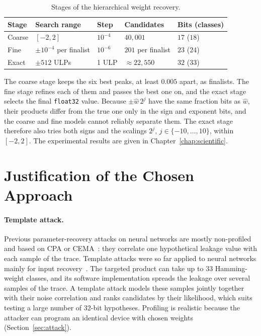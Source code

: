 \begin{table}[htb]
	\centering
	\small
	\caption{Stages of the hierarchical weight recovery.}
	\label{tab:hierarchical-recovery}
	\begin{tabular}{@{}lllll@{}}
		\toprule
		Stage  & Search range               & Step      & Candidates         & Bits (classes) \\
		\midrule
		Coarse & $[-2,2]$                   & $10^{-4}$ & $40{,}001$         & $17$ ($18$)    \\
		Fine   & $\pm 10^{-4}$ per finalist & $10^{-6}$ & $201$ per finalist & $23$ ($24$)    \\
		Exact  & $\pm 512$ ULPs             & 1 ULP     & $\approx 22{,}550$ & $32$ ($33$)    \\
		\bottomrule
	\end{tabular}
\end{table}

The coarse stage keeps the six best peaks, at least $0.005$ apart, as
finalists. The fine stage refines each of them and passes the best one
on, and the exact stage selects the final \texttt{float32} value.
Because $\pm\hat{w}\,2^j$ have the same fraction bits as $\hat{w}$,
their products differ from the true one only in the sign and exponent
bits, and the coarse and fine models cannot reliably separate them. The
exact stage therefore also tries both signs and the scalings $2^j$,
$j\in\{-10,\ldots,10\}$, within $[-2,2]$. The experimental results are
given in Chapter~\ref{chap:scientific}.

\section{Justification of the Chosen Approach}
\label{sec:justification}

\paragraph{Template attack.}
Previous parameter-recovery attacks on neural networks are mostly
non-profiled and based on CPA or CEMA~\cite{batina2019csi,
	joud2022practical, nozaki2024power}: they correlate one hypothetical
leakage value with each sample of the trace. Template attacks were so
far applied to neural networks mainly for input
recovery~\cite{wei2018iknow}. The targeted product can take up to $33$
Hamming-weight classes, and its software implementation spreads the
leakage over several samples of the trace. A template attack models
these samples jointly together with their noise correlation and ranks
candidates by their likelihood, which suits testing a large number of
$32$-bit hypotheses. Profiling is realistic because the attacker can
program an identical device with chosen weights
(Section~\ref{sec:attack}).

